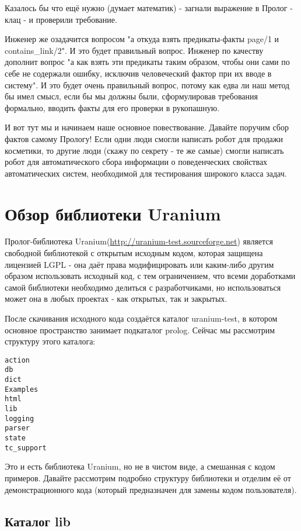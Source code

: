 \documentclass[a4paper]{book}
\def\ur{Uranium}
\begin{document}
Казалось бы что ещё нужно (думает математик) - загнали выражение
в Пролог - клац - и проверили требование.

Инженер же озадачится вопросом "а откуда взять предикаты-факты
page/1 и contains\_link/2". И это будет правильный
вопрос. Инженер по качеству дополнит вопрос "а как взять эти
предикаты таким образом, чтобы они сами по себе не содержали
ошибку, исключив человеческий фактор при их вводе в систему". И
это будет очень правильный вопрос, потому как едва ли наш метод
бы имел смысл, если бы мы должны были, сформулировав требования
формально, вводить факты для его проверки в рукопашную.

И вот тут мы и начинаем наше основное повествование.  Давайте
поручим сбор фактов самому Прологу! Если одни люди смогли
написать робот для продажи косметики, то другие люди (скажу по
секрету - те же самые) смогли написать робот для автоматического
сбора информации о поведенческих свойствах автоматических систем,
необходимой для тестирования широкого класса задач.


\chapter{Обзор библиотеки \ur}

Пролог-библиотека \ur (\url{http://uranium-test.sourceforge.net})
является свободной библиотекой с открытым исходным кодом, которая
защищена лицензией LGPL - она даёт права модифицировать или
каким-либо другим образом использовать исходный код, с тем
ограничением, что всеми доработками самой библиотеки необходимо
делиться с разработчиками, но использоваться может она в любых
проектах - как открытых, так и закрытых.

После скачивания исходного кода создаётся каталог uranium-test, в
котором основное пространство занимает подкаталог prolog. Сейчас
мы рассмотрим структуру этого каталога:

\begin{verbatim}
action
db
dict
Examples
html
lib
logging
parser
state
tc_support
\end{verbatim}

Это и есть библиотека \ur, но не в чистом виде, а смешанная с
кодом примеров. Давайте рассмотрим подробно структуру библиотеки
и отделим её от демонстрационного кода (который предназначен для
замены кодом пользователя).

\section{Каталог lib}
\end{document}
